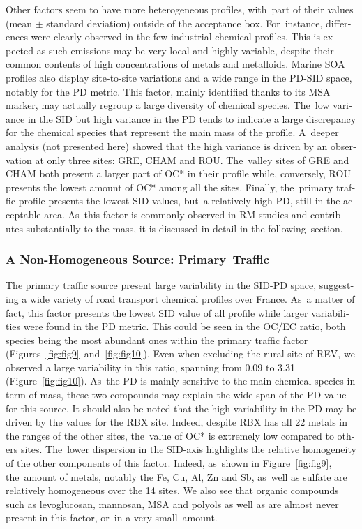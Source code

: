 \begin{otherlanguage}{english}
Other factors seem to have more heterogeneous profiles, with~part of their values (mean
$\pm$ standard deviation) outside of the acceptance box. For~instance, differences  were
clearly observed in the few industrial chemical profiles. This is expected as such
emissions may be very local and highly variable, despite their common contents of high
concentrations of metals and metalloids. Marine SOA profiles also display site-to-site
variations and a wide range in the PD-SID space, notably for the PD metric. This factor,
mainly identified thanks to its MSA marker, may actually regroup a large diversity of
chemical species. The~low variance in the SID but high variance in the PD tends to
indicate a large discrepancy for the chemical species that represent the main mass of the
profile. A~deeper analysis (not presented here) showed  that the high variance is driven
by an observation at only three sites: GRE, CHAM and ROU. The~valley sites of GRE and CHAM
both present a larger part of OC* in their profile while, conversely, ROU presents the
lowest amount of OC* among all the sites.  Finally, the~primary traffic profile presents
the lowest SID values, but~a relatively high PD, still in the acceptable area. As~this
factor is commonly observed in RM studies and contributes substantially to the \PM{} mass,
it is discussed in detail in the following~section.

\subsubsection{A Non-Homogeneous Source: Primary~Traffic}%
\label{ssub:a_non_homogeneous_source_primary_traffic}

The primary traffic source present large variability in the SID-PD space, suggesting a
wide variety of road transport chemical profiles over France. As~a matter of fact, this
factor presents the lowest SID value of all profile while larger variabilities  were found
in the PD metric. This could be seen in the OC/EC ratio, both species being the most
abundant ones within the primary traffic factor
(Figures~\ref{fig:fig9}~and~\ref{fig:fig10}). Even  when excluding the rural site of REV,
we observed a large variability in this ratio, spanning from 0.09 to 3.31
(Figure~\ref{fig:fig10}). As~the PD is mainly sensitive to the main chemical species in
term of mass, these two compounds may explain the wide span of the PD value for this
source.  It should also be noted that the high variability in the PD may be driven by the
values for the RBX site. Indeed, despite RBX has all   22 metals in the ranges of the
other sites, the~value of OC* is extremely low compared  to others sites. The~lower
dispersion in the SID-axis highlights the relative homogeneity of the other components of
this factor. Indeed, as~shown in Figure~\ref{fig:fig9}, the~amount of metals, notably the
Fe, Cu, Al, Zn and Sb, as~well as  sulfate are relatively homogeneous over the 14 sites.
We also see that organic compounds such as levoglucosan, mannosan, MSA and polyols as well
as  are almost never present in this factor, or~in a very small~amount.


\end{otherlanguage}
